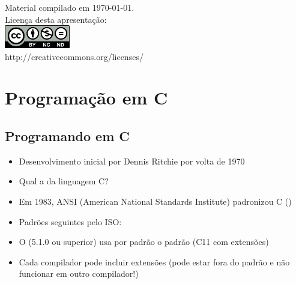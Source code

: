 \documentclass[portuguese,10pt,xcolor=table]{beamer}
\title{\insertlecture}
\author{Prof. Fernando Figueira\\(adaptado do material do Prof. Rafael Beserra Gomes)}
\institute{UFRN}
\date{}
\begin{document}
\begin{frame}
  \maketitle
 \begin{center}
 \tiny
Material compilado em \today.\\
  Licença desta apresentação:\\
		\includegraphics[height=1.0cm]{by-nc-nd.png}\\
http://creativecommons.org/licenses/
	\end{center}
\end{frame}


\section{Programação em C}

\subsection{Programando em C}
	\begin{frame}
	  \begin{itemize}
		  \item Desenvolvimento inicial por Dennis Ritchie por volta de 1970
		  \item Qual a  da linguagem C?
		  \item Em 1983, ANSI (American National Standards Institute) padronizou C ()
		  \item Padrões seguintes pelo ISO: 
		  \item O  (5.1.0 ou superior) usa por padrão o padrão  (C11 com extensões)
		  \item Cada compilador pode incluir extensões (pode estar fora do padrão e não funcionar em outro compilador!)
	  \end{itemize}
	\end{frame}
\end{document}
